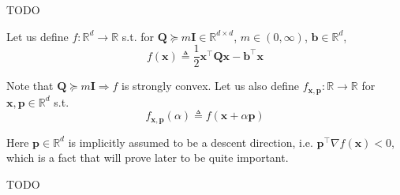 \documentclass{article}
\begin{document}
\medskip

TODO


Let us define $ f : \mathbb{R}^d \rightarrow \mathbb{R} $ s.t. for
$ \mathbf{Q} \succeq m\mathbf{I} \in \mathbb{R}^{d \times d} $,
$ m \in (0, \infty) $, $ \mathbf{b} \in \mathbb{R}^d $,
\begin{equation} \label{eq:3.3.1}
    f(\mathbf{x}) \triangleq
    \frac{1}{2}\mathbf{x}^\top\mathbf{Qx} - \mathbf{b}^\top\mathbf{x}
\end{equation}

Note that $ \mathbf{Q} \succeq m\mathbf{I} \Rightarrow f $ is strongly convex.
Let us also define
$ f_{\mathbf{x}, \mathbf{p}} : \mathbb{R} \rightarrow \mathbb{R} $ for
$ \mathbf{x}, \mathbf{p} \in \mathbb{R}^d $ s.t.
\begin{equation} \label{eq:3.3.2}
    f_{\mathbf{x}, \mathbf{p}}(\alpha) \triangleq
    f(\mathbf{x} + \alpha\mathbf{p})
\end{equation}

Here $ \mathbf{p} \in \mathbb{R}^d $ is implicitly assumed to be a descent
direction, i.e. $ \mathbf{p}^\top\nabla f(\mathbf{x}) < 0 $, which is a fact
that will prove later to be quite important.

\medskip

TODO
\end{document}
